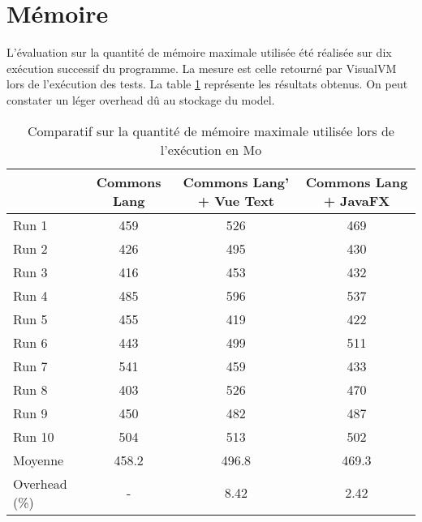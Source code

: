 \section{Mémoire}
\label{memoire}

L'évaluation sur la quantité de mémoire maximale utilisée été réalisée sur dix exécution successif du programme. La mesure est celle retourné par VisualVM lors de l'exécution des tests. La table \ref{evaluation_memoire} représente les résultats obtenus. On peut constater un léger overhead dû au stockage du model.

\begin{table}[H]
\centering
\begin{tabular}{|l|c|c|c|}
\hline
         & Commons Lang & Commons Lang' + Vue Text & Commons Lang + JavaFX\\
         \hline
Run 1     & 459  & 526       & 469        \\
Run 2     & 426  & 495       & 430        \\
Run 3     & 416  & 453       & 432        \\
Run 4     & 485  & 596       & 537        \\
Run 5     & 455  & 419       & 422        \\
Run 6     & 443  & 499       & 511        \\
Run 7     & 541  & 459       & 433        \\
Run 8     & 403  & 526       & 470        \\
Run 9     & 450  & 482       & 487        \\
Run 10    & 504  & 513       & 502        \\
\hline
Moyenne  & 458.2  & 496.8       & 469.3        \\
\hline
Overhead (\%) & -  & 8.42       & 2.42   \\
\hline    
\end{tabular}
\caption{Comparatif sur la quantité de mémoire maximale utilisée lors de l'exécution en Mo}
\label{evaluation_memoire}
\end{table}

